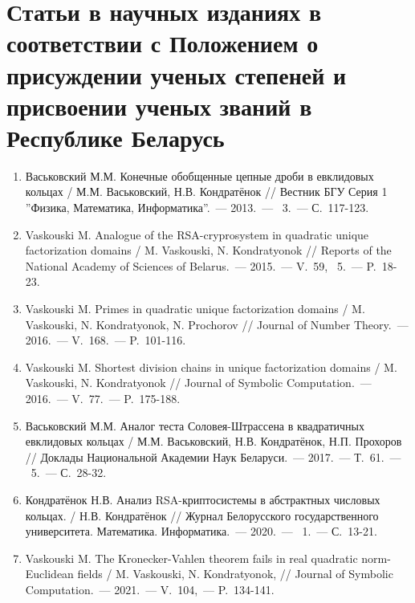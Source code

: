 \renewcommand{\labelenumi}{\arabic{enumi}--A}
\renewcommand{\theenumi}{\arabic{enumi}--A}

\vspace{-4ex}
\section*{\fontsize{14}{15}\selectfont Статьи в научных изданиях в соответствии с Положением о присуждении ученых степеней и присвоении ученых званий в Республике Беларусь}
\vspace{-4ex}

\begin{enumerate}

    \item \label{source:Vestnik_BSU_2013}
    Васьковский М.М. Конечные обобщенные цепные дроби в евклидовых кольцах / М.М. Васьковский, Н.В. Кондратёнок // Вестник БГУ Серия 1 ''Физика, Математика, Информатика''.~--- 2013.~--- \textnumero~3.~--- С.~117-123.

    \item \label{source:NANB_2015}
    Vaskouski M. Analogue of the RSA-cryprosystem in quadratic unique \mbox{factorization} domains / M. Vaskouski, N. Kondratyonok // Reports of the National Academy of Sciences of Belarus.~--- 2015.~--- V.~59, \textnumero~5.~--- P.~18-23.

    \item \label{source:JNT_2016}
    Vaskouski M. Primes in quadratic unique factorization domains / M. \mbox{Vaskouski}, N. Kondratyonok, N. Prochorov // Journal of Number Theory.~--- 2016.~--- V.~168.~--- P.~101-116.

    \item \label{source:JSC_2016}
    Vaskouski M. Shortest division chains in unique factorization domains / M. Vaskouski, N. Kondratyonok // Journal of Symbolic Computation.~--- 2016.~--- V.~77.~--- P.~175-188.

    \item \label{source:NANB_2017}
    Васьковский М.М. Аналог теста Соловея-Штрассена в квадратичных евклидовых кольцах / М.М. Васьковский, Н.В. Кондратёнок, Н.П. Прохоров // Доклады Национальной Академии Наук Беларуси.~--- 2017.~--- Т.~61.~--- \textnumero~5.~--- С.~28-32.

    \item \label{source:BSU_Journal_2020}
    Кондратёнок Н.В. Анализ RSA-криптосистемы в абстрактных числовых кольцах. / Н.В. Кондратёнок // Журнал Белорусского государственного университета. Математика. Информатика.~--- 2020.~--- \textnumero~1.~--- С.~13-21.

    \item \label{source:JSC_2021}
    Vaskouski M. The Kronecker-Vahlen theorem fails in real quadratic norm-Euclidean fields / M. Vaskouski, N. Kondratyonok, // Journal of Symbolic Computation.~--- 2021.~--- V.~104,~--- P.~134-141.

\end{enumerate}

